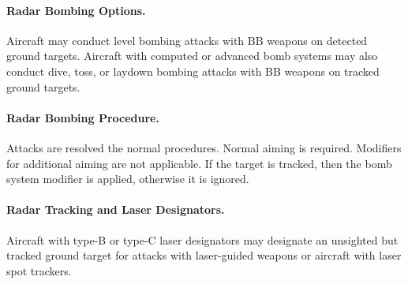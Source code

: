 \begin{advancedrules}
{\paragraph{Radar Bombing Options.} Aircraft may conduct level bombing attacks with BB weapons on detected ground targets. Aircraft with computed or advanced bomb systems may also conduct dive, toss, or laydown bombing attacks with BB weapons on tracked ground targets.

\paragraph{Radar Bombing Procedure.} Attacks are resolved the normal procedures. Normal aiming is required. Modifiers for additional aiming are not applicable. If the target is tracked, then the bomb system modifier is applied, otherwise it is ignored. 

\paragraph{Radar Tracking and Laser Designators.} Aircraft with type-B or type-C laser designators may designate an unsighted but tracked ground target for attacks with laser-guided weapons or aircraft with laser spot trackers.


}



\end{advancedrules}
